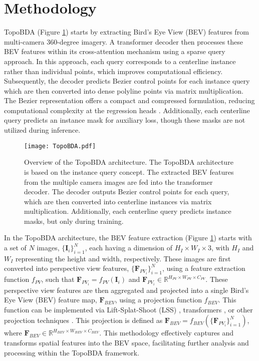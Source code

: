 \section{Methodology}

TopoBDA (Figure \ref{fig: TopoBDA_overview}) starts by extracting Bird’s Eye View (BEV) features from multi-camera 360-degree imagery. A transformer decoder then processes these BEV features within its cross-attention mechanism using a sparse query approach. In this approach, each query corresponds to a centerline instance rather than individual points, which improves computational efficiency. Subsequently, the decoder predicts Bezier control points for each instance query which are then converted into dense polyline points via matrix multiplication. The Bezier representation offers a compact and compressed formulation, reducing computational complexity at the regression heads \cite{feng2022rethinking, qiao2023end, li2023graph}. Additionally, each centerline query predicts an instance mask for auxiliary loss, though these masks are not utilized during inference.

\begin{figure}[tb]
  \centering
  \texttt{[image: TopoBDA.pdf]}
  \caption{Overview of the TopoBDA architecture. The TopoBDA architecture is based on the instance query concept. The extracted BEV features from the multiple camera images are fed into the transformer decoder. The decoder outputs Bezier control points for each query, which are then converted into centerline instances via matrix multiplication. Additionally, each centerline query predicts instance masks, but only during training.}
  \label{fig: TopoBDA_overview}
\end{figure}


In the TopoBDA architecture, the BEV feature extraction  (Figure \ref{fig: TopoBDA_overview}) starts with a set of $N$ images, $\{\mathbf{I}_{i}\}_{i=1}^N$, each having a dimension of $H_I \times W_I \times 3$, with $H_I$ and $W_I$ representing the height and width, respectively. These images are first converted into perspective view features, $\{\mathbf{F}_{PV_i}\}_{i=1}^N$, using a feature extraction function $f_{PV}$, such that $\mathbf{F}_{PV_i} = f_{PV}(\mathbf{I}_i)$ and $\mathbf{F}_{PV_i} \in \mathbb{R}^{H_{PV} \times W_{PV} \times C_{PV}}$. These perspective view features are then aggregated and projected into a single Bird's Eye View (BEV) feature map, $\mathbf{F}_{BEV}$, using a projection function $f_{BEV}$. This function can be implemented via Lift-Splat-Shoot (LSS) \cite{philion2020lift, huang2021bevdet, li2023bevdepth}, transformers \cite{li2022bevformer, chen2022efficient, zhou2022cross, wang2023exploring}, or other projection techniques \cite{li2024fast, xie2022m, harley2023simple}. This projection is defined as $\mathbf{F}_{BEV} = f_{BEV}(\{\mathbf{F}_{PV_i}\}_{i=1}^N)$, where $\mathbf{F}_{BEV} \in \mathbb{R}^{H_{BEV} \times W_{BEV} \times C_{BEV}}$. This methodology effectively captures and transforms spatial features into the BEV space, facilitating further analysis and processing within the TopoBDA framework.

